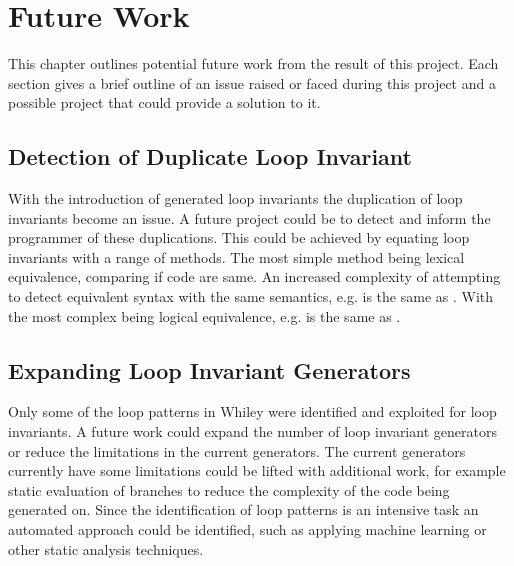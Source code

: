 \chapter{Future Work}\label{C:future}

This chapter outlines potential future work from the result of this project.
Each section gives a brief outline of an issue raised or faced during this
project and a possible project that could provide a solution to it.

\section{Detection of Duplicate Loop Invariant}

With the introduction of generated loop invariants the duplication of loop
invariants become an issue.
A future project could be to detect and inform the programmer of these
duplications.
This could be achieved by equating loop invariants with a range of methods.
The most simple method being lexical equivalence, comparing if code are same.
An increased complexity of attempting to detect equivalent syntax with the same
semantics, e.g.  is the same as .
With the most complex being logical equivalence, e.g.  is the same
as .


\section{Expanding Loop Invariant Generators}

Only some of the loop patterns in Whiley were identified and exploited for loop
invariants.
A future work could expand the number of loop invariant generators or reduce
the limitations in the current generators.
The current generators currently have some limitations could be lifted with
additional work, for example static evaluation of branches to reduce the
complexity of the code being generated on.
Since the identification of loop patterns is an intensive task an automated
approach could be identified, such as applying machine learning or other static
analysis techniques.


